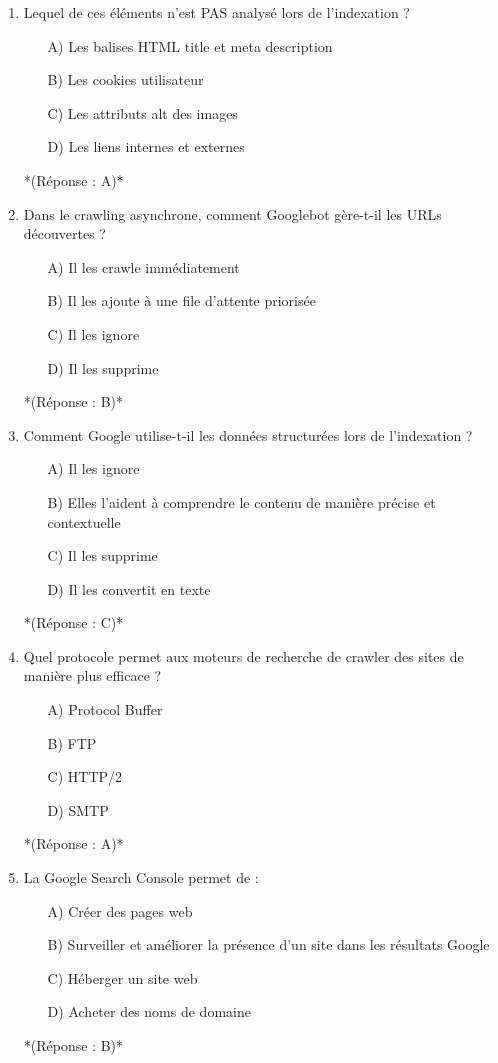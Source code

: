 \documentclass[12pt,a4paper,twoside]{report}
\begin{document}
\begin{enumerate}
\item Lequel de ces éléments n'est PAS analysé lors de l'indexation ?
\begin{itemize}
\item[A)] Les balises HTML title et meta description
\item[B)] Les cookies utilisateur
\item[C)] Les attributs alt des images
\item[D)] Les liens internes et externes
\end{itemize}
*(Réponse : A)*

\item Dans le crawling asynchrone, comment Googlebot gère-t-il les URLs découvertes ?
\begin{itemize}
\item[A)] Il les crawle immédiatement
\item[B)] Il les ajoute à une file d'attente priorisée
\item[C)] Il les ignore
\item[D)] Il les supprime
\end{itemize}
*(Réponse : B)*

\item Comment Google utilise-t-il les données structurées lors de l'indexation ?
\begin{itemize}
\item[A)] Il les ignore
\item[B)] Elles l'aident à comprendre le contenu de manière précise et contextuelle
\item[C)] Il les supprime
\item[D)] Il les convertit en texte
\end{itemize}
*(Réponse : C)*

\item Quel protocole permet aux moteurs de recherche de crawler des sites de manière plus efficace ?
\begin{itemize}
\item[A)] Protocol Buffer
\item[B)] FTP
\item[C)] HTTP/2
\item[D)] SMTP
\end{itemize}
*(Réponse : A)*

\item La Google Search Console permet de :
\begin{itemize}
\item[A)] Créer des pages web
\item[B)] Surveiller et améliorer la présence d'un site dans les résultats Google
\item[C)] Héberger un site web
\item[D)] Acheter des noms de domaine
\end{itemize}
*(Réponse : B)*
\end{enumerate}
\end{document}
